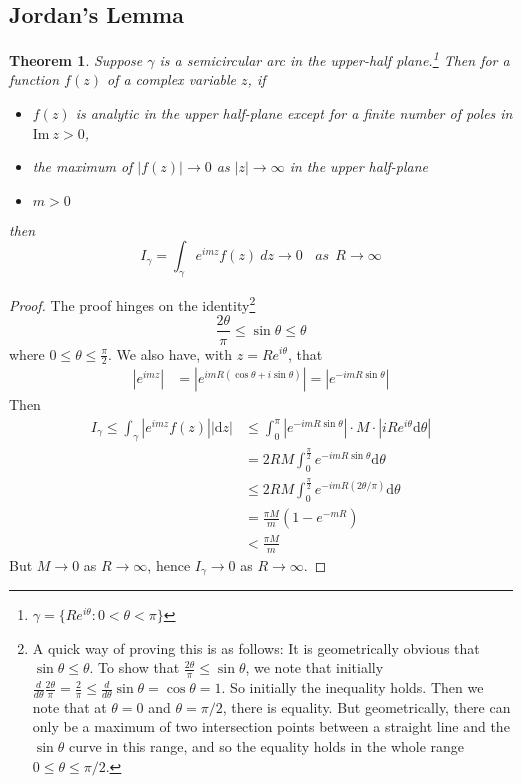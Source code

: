 
\subsection{Jordan's Lemma}
\newtheorem{T11}{Theorem}
\begin{T11} Suppose $\gamma$ is a semicircular arc in the upper-half plane.\footnote{$\gamma=\{Re^{i\theta}:0<\theta<\pi\}$} Then for a function $f(z)$ of a complex variable $z$, if 
\begin{itemize}
\item $f(z)$ is analytic in the upper half-plane except for a finite number of poles in $\text{Im}\ z>0$,
\item the maximum of $|f(z)|\to 0$ as $|z|\to \infty$ in the upper half-plane
\item $m>0$
\end{itemize}
then 
$$I_\gamma=\int_\gamma e^{imz}f(z)\ dz\to 0  \ \ \ \ as \ \ R\to \infty$$
\end{T11}
\begin{proof}
The proof hinges on the identity\footnote{A quick way of proving this is as follows: It is geometrically obvious that $\sin\theta\leq \theta$. To show that $\frac{2\theta}{\pi}\leq\sin\theta$, we note that initially $\frac{d}{d \theta}\frac{2\theta}{\pi}=\frac{2}{\pi}\leq\frac{d}{d \theta}\sin\theta=\cos\theta=1$. So initially the inequality holds. Then we note that at $\theta=0$ and $\theta=\pi/2$, there is equality. But geometrically, there can only be a maximum of two intersection points between a straight line and the $\sin\theta$ curve in this range, and so the equality holds in the whole range $0\leq \theta \leq \pi/2$.}
$$\frac{2\theta}{\pi}\leq \sin\theta \leq \theta$$
where $0\leq \theta\leq \frac{\pi}{2}$. We also have, with $z=R e^{i\theta}$, that 
\begin{align*}
|e^{imz}|&=|e^{imR(\cos\theta +i\sin\theta)}|=|e^{-imR\sin\theta}|
\end{align*}
Then
\begin{align*}
I_\gamma \leq \int_\gamma |e^{imz}f(z)| |\text{d}z|&\leq \int_{0}^{\pi} |e^{-imR\sin\theta}|\cdot M\cdot |iR e^{i\theta}\text{d}\theta|\\
&=2RM\int_{0}^{\frac{\pi}{2}} e^{-imR\sin\theta} \text{d}\theta\\
&\leq 2RM\int_{0}^{\frac{\pi}{2}} e^{-imR(2\theta / \pi)} \text{d}\theta\\
&=\frac{\pi M}{m}\left ( 1-e^{-mR}\right)\\
&<\frac{\pi M}{m}
\end{align*}
But $M\to 0$ as $R\to \infty$, hence $I_\gamma\to 0$ as $R\to \infty$.
\end{proof}
